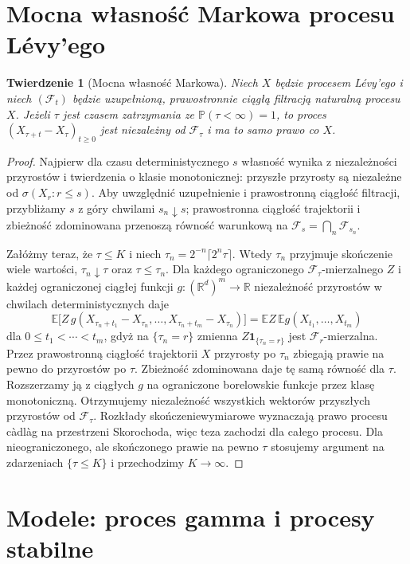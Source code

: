 \documentclass[11pt,a4paper,oneside]{report}
\numberwithin{equation}{chapter}
\theoremstyle{plain}
\newtheorem{twierdzenie}{Twierdzenie}[chapter]
\theoremstyle{definition}
\theoremstyle{remark}
\newcommand{\R}{\mathbb{R}}
\newcommand{\Prob}{\mathbb{P}}
\newcommand{\E}{\mathbb{E}}
\newcommand{\calF}{\mathcal{F}}
\newcommand{\ind}[1]{\mathbf{1}_{#1}}
\begin{document}
\section{Mocna własność Markowa procesu Lévy'ego}\label{sec:volIII:10:07}

\begin{twierdzenie}[Mocna własność Markowa]\label{thm:volIII:10:06}
\label{th:levy-strong-markov}
Niech $X$ będzie procesem Lévy'ego i niech
$(\calF_t)$ będzie uzupełnioną, prawostronnie ciągłą
filtracją naturalną procesu $X$.
Jeżeli $\tau$ jest czasem zatrzymania ze
$\Prob(\tau<\infty)=1$, to proces
$(X_{\tau+t}-X_\tau)_{t\ge0}$ jest niezależny od
$\calF_\tau$ i ma to samo prawo co $X$.
\end{twierdzenie}
\begin{proof}
Najpierw dla czasu deterministycznego $s$ własność wynika
z niezależności przyrostów i twierdzenia o klasie
monotonicznej: przyszłe przyrosty są niezależne od
$\sigma(X_r:r\le s)$. Aby uwzględnić uzupełnienie i
prawostronną ciągłość filtracji, przybliżamy $s$ z góry
chwilami $s_n\downarrow s$; prawostronna ciągłość
trajektorii i zbieżność zdominowana przenoszą równość
warunkową na $\calF_s=\bigcap_{n}\calF_{s_n}$.

Załóżmy teraz, że $\tau\le K$ i niech
$\tau_n=2^{-n}\lceil2^n\tau\rceil$.
Wtedy $\tau_n$ przyjmuje skończenie wiele wartości,
$\tau_n\downarrow\tau$ oraz $\tau\le\tau_n$.
Dla każdego ograniczonego $\calF_\tau$-mierzalnego $Z$
i każdej ograniczonej ciągłej funkcji
$g:(\R^d)^m\to\R$ niezależność przyrostów w
chwilach deterministycznych daje
\[
\E\Big[Z\,g(X_{\tau_n+t_1}-X_{\tau_n},\ldots,
 X_{\tau_n+t_m}-X_{\tau_n})\Big]
=\E Z\,\E g(X_{t_1},\ldots,X_{t_m})
\]
dla $0\le t_1<\cdots<t_m$, gdyż na
$\{\tau_n=r\}$ zmienna $Z\ind{\{\tau_n=r\}}$
jest $\calF_r$-mierzalna. Przez prawostronną ciągłość
trajektorii $X$ przyrosty po $\tau_n$ zbiegają
prawie na pewno do przyrostów po $\tau$.
Zbieżność zdominowana daje tę samą równość dla $\tau$.
Rozszerzamy ją z ciągłych $g$ na ograniczone borelowskie
funkcje przez klasę monotoniczną. Otrzymujemy niezależność
wszystkich wektorów przyszłych przyrostów od $\calF_\tau$.
Rozkłady skończeniewymiarowe wyznaczają prawo procesu
càdlàg na przestrzeni Skorochoda, więc teza zachodzi
dla całego procesu. Dla nieograniczonego, ale skończonego
prawie na pewno $\tau$ stosujemy argument na zdarzeniach
$\{\tau\le K\}$ i przechodzimy $K\to\infty$.
\end{proof}

\section{Modele: proces gamma i procesy stabilne}\label{sec:volIII:10:08}
\end{document}
